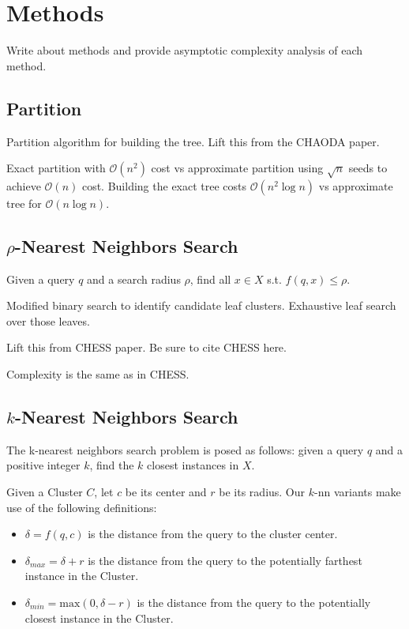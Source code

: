 \section{Methods}
\label{sec:methods}

Write about methods and provide asymptotic complexity analysis of each method.

\subsection{Partition}
\label{subsec:methods:partition}

Partition algorithm for building the tree.
Lift this from the CHAODA paper.

Exact partition with $\mathcal{O}(n^2)$ cost vs approximate partition using $\sqrt{n}$ seeds to achieve $\mathcal{O}(n)$ cost.
Building the exact tree costs $\mathcal{O}(n^2 \log n)$ vs approximate tree for $\mathcal{O}(n \log n)$.

\subsection{\texorpdfstring{$\rho$}{p}-Nearest Neighbors Search}
\label{subsec:methods:rnn-search}

Given a query $q$ and a search radius $\rho$, find all $x \in X$ s.t. $f(q, x) \leq \rho$.

Modified binary search to identify candidate leaf clusters.
Exhaustive leaf search over those leaves.

Lift this from CHESS paper. Be sure to cite CHESS here.

Complexity is the same as in CHESS.

\subsection{\texorpdfstring{$k$}{k}-Nearest Neighbors Search}
\label{subsec:methods:knn-search}

The k-nearest neighbors search problem is posed as follows: given a query $q$ and a positive integer $k$, find the $k$ closest instances in $X$.

Given a Cluster $C$, let $c$ be its center and $r$ be its radius. Our $k$-nn variants make use of the following definitions:
\begin{itemize}
    \item $\delta = f(q, c)$ is the distance from the query to the cluster center.
    \item $\delta_{max} = \delta + r$ is the distance from the query to the potentially farthest instance in the Cluster.
    \item $\delta_{min} = \text{max}(0, \delta - r)$ is the distance from the query to the potentially closest instance in the Cluster.
\end{itemize}


